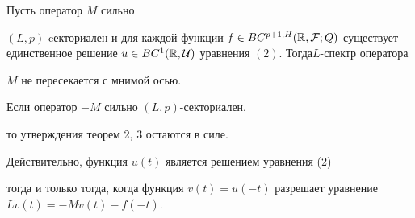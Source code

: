 \begin{thm}


Пусть оператор $M$ сильно


$(L,p)$-cекториален и для каждой функции $f \in BC^{p+1,H}({\Bbb


R},{\cal F};Q)$ существует единственное решение $u \in BC^1({\Bbb


R},{\cal U})$ уравнения $(2)$. Тогда\linebreak $L$-спектр оператора


$M$ не пересекается с мнимой осью. 


\end{thm}








\begin{note}


Если оператор $-M$ сильно $(L,p)$-секториален,


то утверждения теорем 2, 3 остаются в силе.


Действительно, функция $u(t)$ является решением уравнения (2)


тогда и только тогда, когда функция $v(t)=u(-t)$ разрешает уравнение $L\Dot


v(t)=-Mv(t)-f(-t)$.


\end{note}








